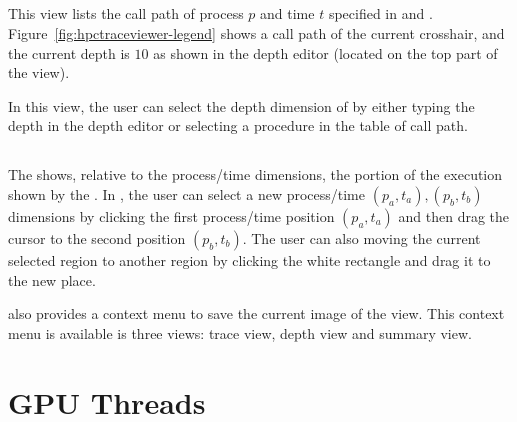 \subsection{\callview}
\label{sec:callview}


This view lists the call path of process $p$ and time $t$ specified in \traceview{} and \depthview.
Figure~\ref{fig:hpctraceviewer-legend} shows a call path of the current crosshair, and the current depth is $10$ as shown in the depth editor (located on the top part of the view).

In this view, the user can select the depth dimension of \traceview{} by either typing the depth in the depth editor or selecting a procedure in the table of call path.

\subsection{\miniview}
\label{sec:miniview}

The \miniview{} shows, relative to the process/time dimensions, the portion of the execution shown by the \traceview.
In \miniview{}, the user can select a new process/time $(p_a,t_a),(p_b,t_b)$ dimensions by clicking the first process/time position $(p_a,t_a)$ and then drag the cursor to the second position $(p_b,t_b)$.
The user can also moving the current selected region to another region by clicking the white rectangle and drag it to the new place.




\hpctraceviewer{} also provides a context menu to save the current image of the view.
This context menu is available is three views: trace view, depth view and summary view.


\section{GPU Threads}

